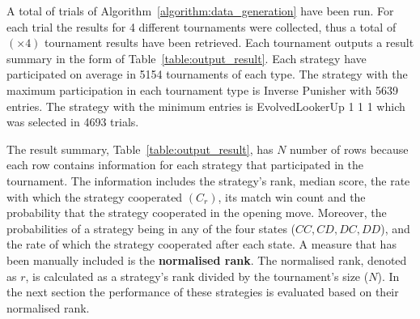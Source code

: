 \documentclass{article}
\newcommand{\uniquenumberofseeds}{}
\newcommand{\numberofalltournaments}{}
\begin{document}
A total of \uniquenumberofseeds trials of Algorithm~\ref{algorithm:data_generation} have been
run. For each trial the results for 4 different tournaments were collected,
thus a total of \numberofalltournaments $(\uniquenumberofseeds \times 4)$ tournament results have been
retrieved. Each tournament outputs a result summary in the form of
Table~\ref{table:output_result}. Each strategy have participated on average in
5154 tournaments of each type. The strategy with the maximum participation in each
tournament type is Inverse Punisher with 5639 entries. The strategy with the
minimum entries is EvolvedLookerUp 1 1 1 which was selected in 4693 trials.

The result summary, Table~\ref{table:output_result}, has \(N\) number of rows
because each row contains information for each strategy that participated in the
tournament. The information includes the strategy's rank, median score, the rate
with which the strategy cooperated $(C_r)$, its match win count and the
probability that the strategy cooperated in the opening move. Moreover, the
probabilities of a strategy being in any of the four states ($CC, CD, DC, DD$),
and the rate of which the strategy cooperated after each state. A measure that
has been manually included is the \textbf{normalised rank}. The normalised rank,
denoted as $r$, is calculated as a strategy's rank divided by the tournament's
size ($N$). In the next section the performance of these strategies is evaluated
based on their normalised rank.
\end{document}
